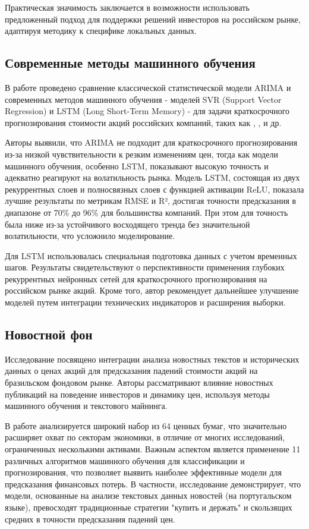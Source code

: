 \documentclass[12pt, a4paper]{article}
\begin{document}
Практическая значимость заключается в возможности использовать предложенный подход для поддержки решений инвесторов на российском рынке, адаптируя методику к специфике локальных данных.

\subsection{Современные методы машинного обучения}
В работе \cite{modernml} проведено сравнение классической статистической модели ARIMA и современных методов машинного обучения - моделей SVR (Support Vector Regression) и LSTM (Long Short-Term Memory) - для задачи краткосрочного прогнозирования стоимости акций российских компаний, таких как , ,  и др.

Авторы выявили, что ARIMA не подходит для краткосрочного прогнозирования из-за низкой чувствительности к резким изменениям цен, тогда как модели машинного обучения, особенно LSTM, показывают высокую точность и адекватно реагируют на волатильность рынка. Модель LSTM, состоящая из двух рекуррентных слоев и полносвязных слоев с функцией активации ReLU, показала лучшие результаты по метрикам RMSE и R², достигая точности предсказания в диапазоне от 70\% до 96\% для большинства компаний. При этом для  точность была ниже из-за устойчивого восходящего тренда без значительной волатильности, что усложнило моделирование.

Для LSTM использовалась специальная подготовка данных с учетом временных шагов. Результаты свидетельствуют о перспективности применения глубоких рекуррентных нейронных сетей для краткосрочного прогнозирования на российском рынке акций. Кроме того, автор рекомендует дальнейшее улучшение моделей путем интеграции технических индикаторов и расширения выборки.

\subsection{Новостной фон}
Исследование \cite{brazilnews} посвящено интеграции анализа новостных текстов и исторических данных о ценах акций для предсказания падений стоимости акций на бразильском фондовом рынке. Авторы рассматривают влияние новостных публикаций на поведение инвесторов и динамику цен, используя методы машинного обучения и текстового майнинга.

В работе анализируется широкий набор из 64 ценных бумаг, что значительно расширяет охват по секторам экономики, в отличие от многих исследований, ограниченных несколькими активами. Важным аспектом является применение 11 различных алгоритмов машинного обучения для классификации и прогнозирования, что позволяет выявить наиболее эффективные модели для предсказания финансовых потерь. В частности, исследование демонстрирует, что модели, основанные на анализе текстовых данных новостей (на португальском языке), превосходят традиционные стратегии "купить и держать" и скользящих средних в точности предсказания падений цен.
\end{document}
